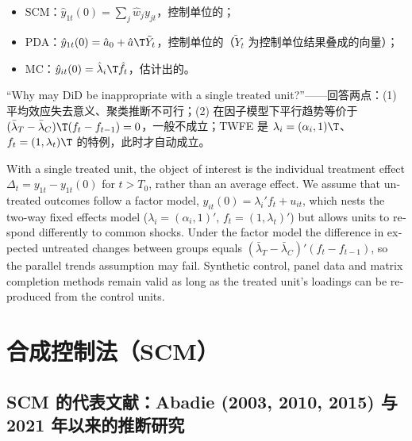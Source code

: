\begin{itemize}
  \item SCM：$\hat y_{1t}(0)=\sum_j\hat w_jy_{jt}$，控制单位的；
  \item PDA：$\hat y_{1t}(0)=\hat a_0+\hat a\T\tilde Y_t$，控制单位的（$\tilde Y_t$ 为控制单位结果叠成的向量）；
  \item MC：$\hat y_{it}(0)=\hat\lambda_i\T\hat f_t$，估计出的。
\end{itemize}

\begin{keypt}[英文试卷常见问法]
“Why may DiD be inappropriate with a single treated unit?”——回答两点：(1) 平均效应失去意义、聚类推断不可行；(2) 在因子模型下平行趋势等价于 $(\bar\lambda_T-\bar\lambda_C)\T(f_t-f_{t-1})=0$，一般不成立；TWFE 是 $\lambda_i=(\alpha_i,1)\T$、$f_t=(1,\lambda_t)\T$ 的特例，此时才自动成立。
\end{keypt}

\begin{english}
With a single treated unit, the object of interest is the individual treatment effect $\Delta_t=y_{1t}-y_{1t}(0)$ for $t>T_0$, rather than an average effect. We assume that untreated outcomes follow a factor model, $y_{it}(0)=\lambda_i'f_t+u_{it}$, which nests the two-way fixed effects model ($\lambda_i=(\alpha_i,1)'$, $f_t=(1,\lambda_t)'$) but allows units to respond differently to common shocks. Under the factor model the difference in expected untreated changes between groups equals $(\bar\lambda_T-\bar\lambda_C)'(f_t-f_{t-1})$, so the parallel trends assumption may fail. Synthetic control, panel data and matrix completion methods remain valid as long as the treated unit's loadings can be reproduced from the control units.
\end{english}

\section{合成控制法（SCM）}\label{sec:U16-scm}

\subsection{SCM 的代表文献：Abadie (2003, 2010, 2015) 与 2021 年以来的推断研究}

